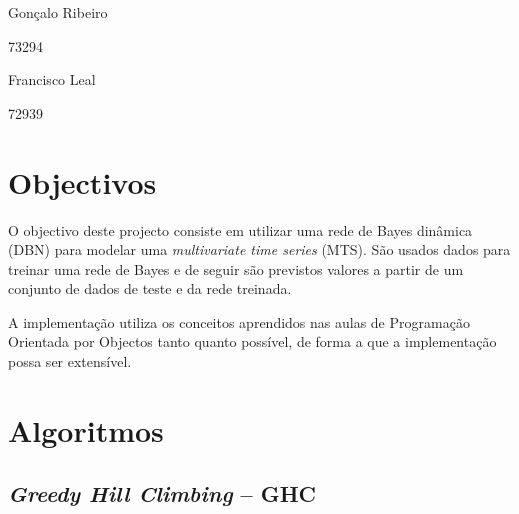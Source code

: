 \documentclass[a4paper]{article}
\begin{document}
    
    




	\trSetAuthors
	{
		\begin{center}
			Gonçalo Ribeiro

			73294
		\end{center}
	}{
		\begin{center}
			Francisco Leal

			72939
		\end{center}
	}


	\trMakeCover

	\tableofcontents

	\pagebreak

	\setcounter{page}{1}


	


	\section{Objectivos}

	O objectivo deste projecto consiste em utilizar uma rede de Bayes dinâmica (DBN) para modelar uma \textit{multivariate time series} (MTS). São usados dados para treinar uma rede de Bayes e de seguir são previstos valores a partir de um conjunto de dados de teste e da rede treinada.
    
    A implementação utiliza os conceitos aprendidos nas aulas de Programação Orientada por Objectos tanto quanto possível, de forma a que a implementação possa ser extensível.
	


	\section{Algoritmos}

      \subsection{\textit{Greedy Hill Climbing} -- GHC}
\end{document}
